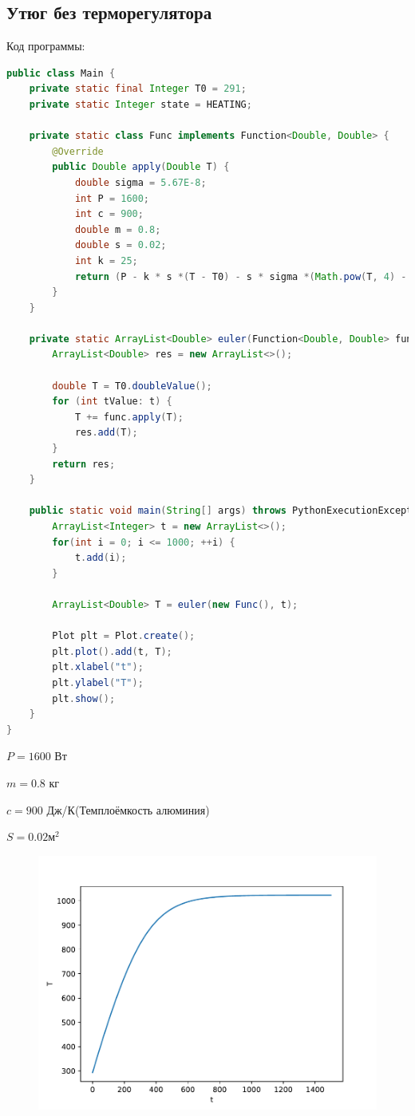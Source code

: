 \documentclass[a4paper, 14pt]{extarticle}
\begin{document}
		\subsection{Утюг без терморегулятора}
			Код программы:
			\begin{lstlisting}[language=Java]
public class Main {
	private static final Integer T0 = 291;
	private static Integer state = HEATING;
	
	private static class Func implements Function<Double, Double> {
		@Override
		public Double apply(Double T) {
			double sigma = 5.67E-8;
			int P = 1600;
			int c = 900;
			double m = 0.8;
			double s = 0.02;
			int k = 25;
			return (P - k * s *(T - T0) - s * sigma *(Math.pow(T, 4) - Math.pow(T0, 4))) / c * m;
		}
	}
	
	private static ArrayList<Double> euler(Function<Double, Double> func, ArrayList<Integer> t) {
		ArrayList<Double> res = new ArrayList<>();
		
		double T = T0.doubleValue();
		for (int tValue: t) {
			T += func.apply(T);
			res.add(T);
		}
		return res;
	}
	
	public static void main(String[] args) throws PythonExecutionException, IOException {
		ArrayList<Integer> t = new ArrayList<>();
		for(int i = 0; i <= 1000; ++i) {
			t.add(i);
		}
		
		ArrayList<Double> T = euler(new Func(), t);
		
		Plot plt = Plot.create();
		plt.plot().add(t, T);
		plt.xlabel("t");
		plt.ylabel("T");
		plt.show();
	}
}
			\end{lstlisting}
			$P = 1600$ Вт
			
			$m = 0.8$ кг
			
			$c = 900$ Дж/К(Темплоёмкость алюминия)
			
			$S = 0.02 \text{м}^2$
			
			\begin{figure}[H]
				\centering
				\includegraphics[width = \linewidth]{fig1.pdf}
				\caption[.] {}
			\end{figure}
			\pagebreak
		
\end{document}
